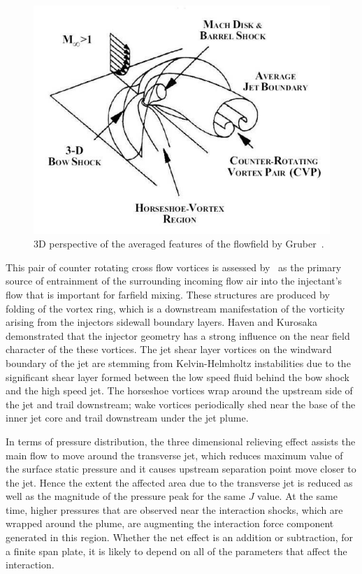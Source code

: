 \documentclass[12pt]{article}
\begin{document}
\begin{figure}[H]
    \centering
    \includegraphics[width=\linewidth]{figs/fg1.7.png}
    \caption{3D perspective of the averaged features of the flowfield by Gruber~\cite{Gruber1995}.}
    \label{fig:1.7}
\end{figure}

This pair of counter rotating cross flow vortices is assessed by~\cite{santiago1995velocity} as the primary source of entrainment of the surrounding incoming flow air into the injectant’s flow that is important for farfield mixing. These structures are produced by folding of the vortex ring, which is a downstream manifestation of the vorticity arising from the injectors sidewall boundary layers. Haven and Kurosaka~\cite{haven1996improved} demonstrated that the injector geometry has a strong influence on the near field character of the these vortices. The jet shear layer vortices on the windward boundary of the jet are stemming from Kelvin-Helmholtz instabilities due to the significant shear layer formed between the low speed fluid behind the bow shock and the high speed jet. The horseshoe vortices wrap around the upstream side of the jet and trail downstream; wake vortices periodically shed near the base of the inner jet core and trail downstream under the jet plume.

In terms of pressure distribution, the three dimensional relieving effect assists the main flow to move around the transverse jet, which reduces maximum value of the surface static pressure and it causes upstream separation point move closer to the jet. Hence the extent the affected area due to the transverse jet is reduced as well as the magnitude of the pressure peak for the same $J$ value. At the same time, higher pressures that are observed near the interaction shocks, which are wrapped around the plume, are augmenting the interaction force component generated in this region. Whether the net effect is an addition or subtraction, for a finite span plate, it is likely to depend on all of the parameters that affect the interaction. %
\end{document}

